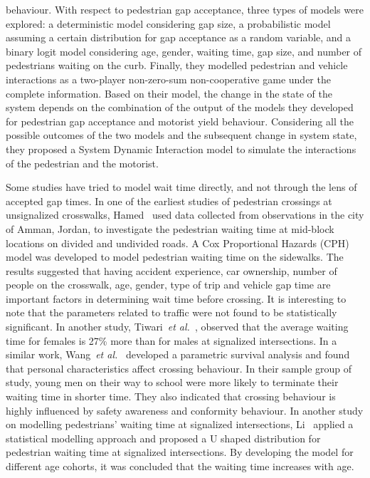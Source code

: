 behaviour. With respect to pedestrian gap acceptance, three types of models were explored: a deterministic model considering gap size, a probabilistic model assuming a certain distribution for gap acceptance as a random variable, and a binary logit model considering age, gender, waiting time, gap size, and number of pedestrians waiting on the curb. Finally, they modelled pedestrian and vehicle interactions as a two-player non-zero-sum non-cooperative game under the complete information. Based on their model, the change in the state of the system depends on the combination of the output of the models they developed for pedestrian gap acceptance and motorist yield behaviour. Considering all the possible outcomes of the two models and the subsequent change in system state, they proposed a System Dynamic Interaction model to simulate the interactions of the pedestrian and the motorist.

Some studies have tried to model wait time directly, and not through the lens of accepted gap times. In one of the earliest studies of pedestrian crossings at unsignalized crosswalks, Hamed~\cite{hamed2001analysis} used data collected from observations in the city of Amman, Jordan, to investigate the pedestrian waiting time at mid-block locations on divided and undivided roads. A Cox Proportional Hazards (CPH) model was developed to model pedestrian waiting time on the sidewalks. The results suggested that having accident experience, car ownership, number of people on the crosswalk, age, gender, type of trip and vehicle gap time are important factors in determining wait time before crossing. It is interesting to note that the parameters related to traffic were not found to be statistically significant. In another study, Tiwari~\textit{et al.}~\cite{tiwari2007survival}, observed that the average waiting time for females is 27\% more than for males at signalized intersections. In a similar work, Wang~\textit{et al.}~\cite{wang2011individual} developed a parametric survival analysis and found that personal characteristics affect crossing behaviour. In their sample group of study, young men on their way to school were more likely to terminate their waiting time in shorter time. They also indicated that crossing behaviour is highly influenced by safety awareness and conformity behaviour. In another study on modelling pedestrians' waiting time at signalized intersections, Li~\cite{li2013model} applied a statistical modelling approach and proposed a U shaped distribution for pedestrian waiting time at signalized intersections. By developing the model for different age cohorts, it was concluded that the waiting time increases with age.

